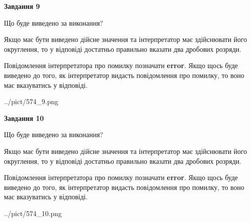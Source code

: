 \documentclass[12pt, ukrainian]{article}
\begin{document}
{\begin {Large}
{\begin {center}\textbf{Завдання 9}\end {center}}\par
Що буде виведено за виконання? \par

Якщо має бути виведено дійсне значення та інтерпретатор має здійснювати його округлення, 
то у відповіді достатньо правильно вказати два дробових розряди.

Повідомлення інтерпретатора про помилку позначати \textbf{error}.
Якщо щось буде виведено до того, як інтерпретатор видасть повідомлення про помилку, 
то воно має вказуватись у відповіді. \par

\begin{center}
	{../pict/574_9.png}
\end{center}
\newpage

{\begin {center}\textbf{Завдання 10}\end {center}}\par
Що буде виведено за виконання? \par

Якщо має бути виведено дійсне значення та інтерпретатор має здійснювати його округлення, 
то у відповіді достатньо правильно вказати два дробових розряди.

Повідомлення інтерпретатора про помилку позначати \textbf{error}.
Якщо щось буде виведено до того, як інтерпретатор видасть повідомлення про помилку, 
то воно має вказуватись у відповіді. \par

\begin{center}
	{../pict/574_10.png}
\end{center}
\newpage

\end {Large}}
\end{document}
